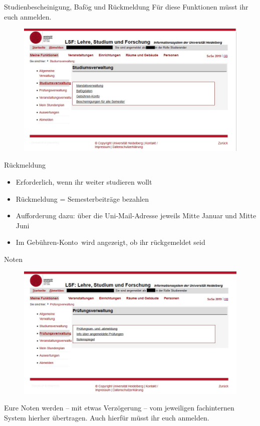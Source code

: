 \begin{frame}{Studienbescheinigung, Bafög und Rückmeldung}
    Für diese Funktionen müsst ihr euch anmelden.
    \begin{figure}
        \centering
        \includegraphics[scale=0.3]{images/lsf12.jpg}
    \end{figure}
\end{frame}

\begin{frame}{Rückmeldung}
    \begin{itemize}
        \item{Erforderlich, wenn ihr weiter studieren wollt}
        \item{Rückmeldung = Semesterbeiträge bezahlen}
        \item{Aufforderung dazu: über die Uni-Mail-Adresse jeweils Mitte Januar und Mitte Juni}
        \item{Im \glqq Gebühren-Konto\grqq \ wird angezeigt, ob ihr rückgemeldet seid}
    \end{itemize}
\end{frame}

\begin{frame}{Noten}
    \begin{figure}
        \centering
        \includegraphics[scale=0.3]{images/lsf13.jpg}
    \end{figure}
    Eure Noten werden -- mit etwas Verzögerung -- vom jeweiligen fachinternen System hierher übertragen. Auch hierfür müsst ihr euch anmelden.
\end{frame}

